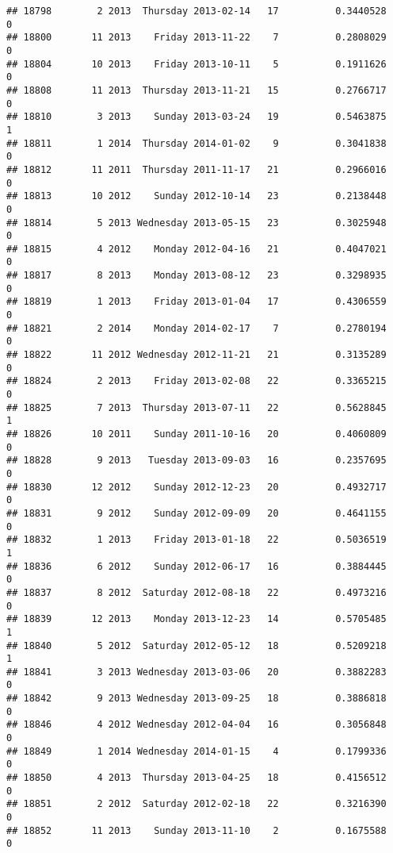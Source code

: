\documentclass[
]{article}
\begin{document}
\begin{verbatim}
## 18798        2 2013  Thursday 2013-02-14   17          0.3440528             0
## 18800       11 2013    Friday 2013-11-22    7          0.2808029             0
## 18804       10 2013    Friday 2013-10-11    5          0.1911626             0
## 18808       11 2013  Thursday 2013-11-21   15          0.2766717             0
## 18810        3 2013    Sunday 2013-03-24   19          0.5463875             1
## 18811        1 2014  Thursday 2014-01-02    9          0.3041838             0
## 18812       11 2011  Thursday 2011-11-17   21          0.2966016             0
## 18813       10 2012    Sunday 2012-10-14   23          0.2138448             0
## 18814        5 2013 Wednesday 2013-05-15   23          0.3025948             0
## 18815        4 2012    Monday 2012-04-16   21          0.4047021             0
## 18817        8 2013    Monday 2013-08-12   23          0.3298935             0
## 18819        1 2013    Friday 2013-01-04   17          0.4306559             0
## 18821        2 2014    Monday 2014-02-17    7          0.2780194             0
## 18822       11 2012 Wednesday 2012-11-21   21          0.3135289             0
## 18824        2 2013    Friday 2013-02-08   22          0.3365215             0
## 18825        7 2013  Thursday 2013-07-11   22          0.5628845             1
## 18826       10 2011    Sunday 2011-10-16   20          0.4060809             0
## 18828        9 2013   Tuesday 2013-09-03   16          0.2357695             0
## 18830       12 2012    Sunday 2012-12-23   20          0.4932717             0
## 18831        9 2012    Sunday 2012-09-09   20          0.4641155             0
## 18832        1 2013    Friday 2013-01-18   22          0.5036519             1
## 18836        6 2012    Sunday 2012-06-17   16          0.3884445             0
## 18837        8 2012  Saturday 2012-08-18   22          0.4973216             0
## 18839       12 2013    Monday 2013-12-23   14          0.5705485             1
## 18840        5 2012  Saturday 2012-05-12   18          0.5209218             1
## 18841        3 2013 Wednesday 2013-03-06   20          0.3882283             0
## 18842        9 2013 Wednesday 2013-09-25   18          0.3886818             0
## 18846        4 2012 Wednesday 2012-04-04   16          0.3056848             0
## 18849        1 2014 Wednesday 2014-01-15    4          0.1799336             0
## 18850        4 2013  Thursday 2013-04-25   18          0.4156512             0
## 18851        2 2012  Saturday 2012-02-18   22          0.3216390             0
## 18852       11 2013    Sunday 2013-11-10    2          0.1675588             0

\end{verbatim}
\end{document}
